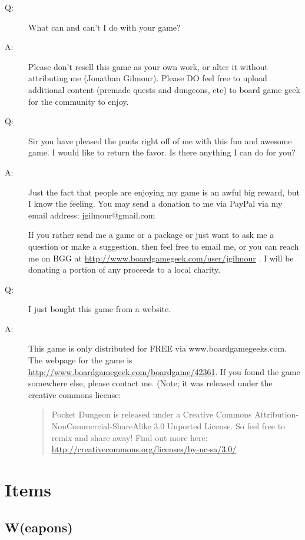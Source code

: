 \documentclass[a6paper,hidelinks]{article}
\begin{document}
\begin{description}
\item[Q:]  What can and can’t I do with your game?
\item[A:]  Please don't resell this game as your own work, or alter it without attributing me (Jonathan Gilmour). Please DO feel free to upload additional content (premade quests and dungeons, etc) to board game geek for the community to enjoy.
\end{description}

\begin{description}
\item[Q:]  Sir you have pleased the pants right off of me with this fun and awesome game. I would like to return the favor. Is there anything I can do for you?
\item[A:]  Just the fact that people are enjoying my game is an awful big reward, but I know the feeling. You may send a donation to me via PayPal via my email address: jgilmour@gmail.com

If you rather send me a game or a package or just want to ask me a question or make a suggestion, then feel free to email me, or you can reach me on BGG at
\url{http://www.boardgamegeek.com/user/jgilmour} . I will be donating a portion of any proceeds to a local charity.
\end{description}

\begin{description}
\item[Q:]  I just bought this game from a website.
\item[A:]  This game is only distributed for FREE via www.boardgamegeeks.com. The webpage for the game is \url{http://www.boardgamegeek.com/boardgame/42361}.   If you found the game somewhere else, please contact me.  (Note; it was released under the creative commons license:
\begin{quote}
Pocket Dungeon is released under a Creative Commons Attribution-NonCommercial-ShareAlike 3.0 Unported License. So feel free to remix and share away! Find out more here: \url{http://creativecommons.org/licenses/by-nc-sa/3.0/}
\end{quote}

\end{description}

\section{Items}

\subsection{W(eapons)}
\end{document}
